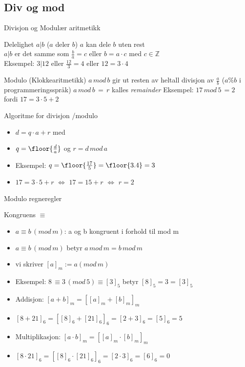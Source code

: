 \subsection*{Div og mod}

\begin{frame}{Divisjon og Modulær aritmetikk}
\begin{block}{Delelighet $a|b$ ($a$ deler $b$)}
$a$ kan dele $b$ uten rest\\
$a|b$ er det samme som $\frac{b}{a}=c$ eller $b=a\cdot c$ med $c \in \mathbb{Z}$\\
Eksempel: $3|12$ eller $\frac{12}{3} = 4$ eller $12=3\cdot 4$
\end{block}
\pause
\begin{block}{Modulo (Klokkearitmetikk)}
$a\, mod\, b$ gir ut resten av heltall divisjon av $\frac{a}{b}$ ($a\%b$ i programmeringsspråk)
$a\, mod\, b\, =\, r$ kalles \textit{remainder}
Eksempel: $17\, mod\, 5\, = 2$ fordi $17=3\cdot 5+2$ 
\end{block}
\end{frame}

\begin{frame}[fragile]{Algoritme for divisjon /modulo}
\begin{itemize}[<+->]
\item $d=q\cdot a + r$ med
\item $q=\floor{\frac{d}{a}}$ og $r=d\, mod\, a$
\item Eksempel: $q=\floor{\frac{17}{5}} = \floor{3.4}=3$
\item $17=3\cdot 5 + r$ $\iff$ $17=15+r$ $\iff$ $r=2$
\end{itemize}
\end{frame}

\begin{frame}{Modulo regneregler}
\begin{block}{Kongruens $\equiv$}
\begin{itemize}
\item $a \equiv b\, (mod\, m)$: a og b kongruent i forhold til mod m
\item $a \equiv b\, (mod\, m)$ betyr $a\, mod\, m=b\, mod\, m$
\item vi skriver $[a]_m := a (mod\, m)$
\item Eksempel: $8\, \equiv 3\, (mod\, 5) \equiv [3]_5$ betyr $[8]_5=3=[3]_5$ 
\end{itemize}
\end{block}
\pause
\begin{itemize}[<+->]
\item Addisjon: $[a+b]_m = [[a]_m + [b]_m]_m$
\item $[8+21]_6 = [[8]_6 + [21]_6]_6 = [2 + 3]_6 = [5]_6 = 5$
\item Multiplikasjon: $[a\cdot b]_m = [[a]_m \cdot [b]_m]_m$
\item $[8 \cdot 21]_6 = [[8]_6 \cdot [21]_6]_6 = [2 \cdot 3]_6 = [6]_6 = 0$
\end{itemize}
\end{frame}

